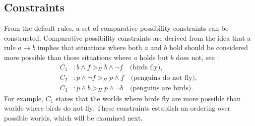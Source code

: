 \documentclass[seminar,english,m]{AIGpaper}
\begin{document}
\subsection{Constraints}
From the default rules, a set of comparative possibility constraints can be constructed. Comparative possibility constraints are derived from the idea that a rule \( a \rightarrow b \) implies that situations where both \( a \) and \( b \) hold should be considered more possible than those situations where \( a \) holds but \( b \) does not, see \cite{dubois2014possibilistic}:  
\begin{align*}
	C_1 &: b \land f >_\Pi b \land \neg f \quad \text{(birds fly)}, \\
	C_2 &: p \land \neg f >_\Pi p \land f \quad \text{(penguins do not fly)}, \\
	C_3 &: p \land b >_\Pi p \land \neg b \quad \text{(penguins are birds)}.
\end{align*}  
For example, \( C_1 \) states that the worlds where birds fly are more possible than worlds where birds do not fly. These constraints establish an ordering over possible worlds, which will be examined next.  
\end{document}
